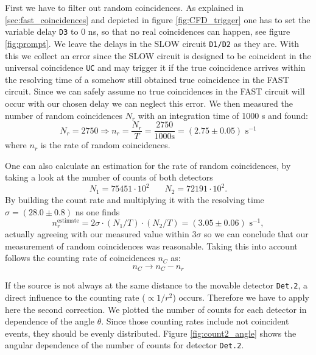 \documentclass[11pt,a4paper,notitlepage]{scrartcl}
\begin{document}
First we have to filter out random coincidences. As explained in \ref{sec:fast_coincidences} and depicted in figure \ref{fig:CFD_trigger} one has to set the variable delay \texttt{D3} to 0 ns, so that no real coincidences can happen, see figure \ref{fig:prompt}. We leave the delays in the SLOW circuit \texttt{D1/D2} as they are. With this we collect an error since the SLOW circuit is designed to be coincident in the universal coincidence \texttt{UC} and may trigger it if the true coincidence arrives within the resolving time of a somehow still obtained true coincidence in the FAST circuit. Since we can safely assume no true coincidences in the FAST circuit will occur with our chosen delay we can neglect this error. We then measured the  number of random coincidences $N_r$ with an integration time of 1000 s and found:
$$N_r=2750 \Rightarrow n_r=\frac{N_r}{T}=\frac{2750}{1000\text{s}}=(2.75\pm0.05)\text{ s}^{-1}$$
where $n_r$ is the rate of random coincidences.

One can also calculate an estimation for the rate of random coincidences, by taking a look at the number of counts of both detectors
$$N_1=75451\cdot 10^2 \phantom{ nun } N_2=72191\cdot 10^2.$$
By building the count rate and multiplying it with the resolving time $\sigma=(28.0\pm0.8)$ ns one finds \cite{siegbahn}
$$n_r^{\text{estimate}}=2\sigma\cdot (N_1/T) \cdot (N_2/T)=(3.05\pm0.06)\text{ s}^{-1},$$
actually agreeing with our measured value within $3\sigma$ so we can conclude that our measurement of random coincidences was reasonable.
Taking this into account follows the counting rate of coincidences $n_C$ as:
$$n_C\rightarrow n_C-n_r$$

 If the source is not always at the same distance to the movable detector \texttt{Det.2}, a direct influence to the counting rate ($\propto1/r^2$) occurs. Therefore we have to apply here the second correction. We plotted the number of counts for each detector in dependence of the angle $\theta$. Since those counting rates include not coincident events, they should be evenly distributed. Figure \ref{fig:count2_angle} shows the angular dependence of the number of counts for detector \texttt{Det.2}.
\end{document}
